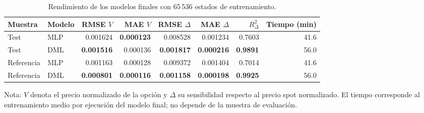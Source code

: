 \begin{table}[htbp]
\centering
\caption{Rendimiento de los modelos finales con $65\,536$ estados de entrenamiento.}
\label{tab:final_ml_metrics}
\small
\begin{tabular}{llrrrrrr}
\toprule
Muestra & Modelo & RMSE $V$ & MAE $V$ & RMSE $\Delta$ & MAE $\Delta$ & $R^2_{\Delta}$ & Tiempo (min) \\
\midrule
Test & MLP & 0.001624 & \textbf{0.000123} & 0.008528 & 0.001234 & 0.7603 & 41.6 \\
Test & DML & \textbf{0.001516} & 0.000136 & \textbf{0.001817} & \textbf{0.000216} & \textbf{0.9891} & 56.0 \\
Referencia & MLP & 0.001163 & 0.000128 & 0.009372 & 0.001404 & 0.7014 & 41.6 \\
Referencia & DML & \textbf{0.000801} & \textbf{0.000116} & \textbf{0.001158} & \textbf{0.000198} & \textbf{0.9925} & 56.0 \\
\bottomrule
\end{tabular}
\begin{flushleft}
\footnotesize
Nota: $V$ denota el precio normalizado de la opción y $\Delta$ su sensibilidad respecto al precio spot normalizado.
El tiempo corresponde al entrenamiento medio por ejecución del modelo final; no depende de la muestra de evaluación.
\end{flushleft}
\end{table}
